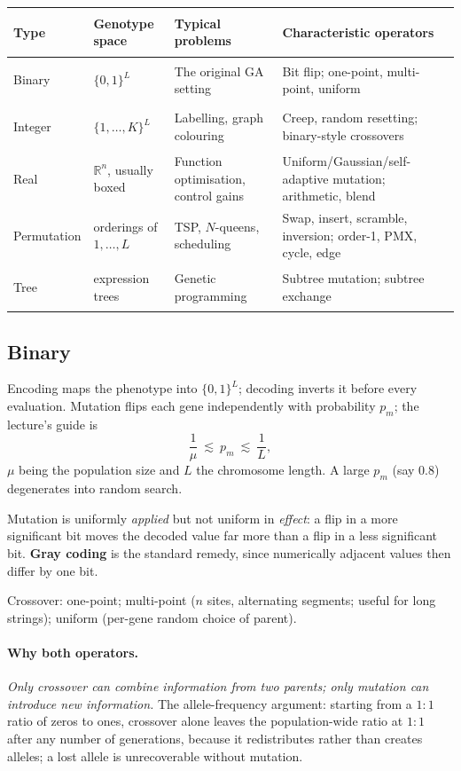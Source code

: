 \documentclass[11pt,a4paper]{article}
\newcommand{\R}{\mathbb{R}}
\begin{document}
\begin{center}
\begin{tabular}{@{}>{\bfseries\raggedright\arraybackslash}p{}
  >{\raggedright\arraybackslash}p{}
  >{\raggedright\arraybackslash}p{}
  >{\raggedright\arraybackslash}p{}@{}}
\toprule
Type & Genotype space & Typical problems & Characteristic operators\\
\midrule
Binary & $\{0,1\}^L$ & The original GA setting & Bit flip; one-point, multi-point, uniform\\
Integer & $\{1,\ldots,K\}^L$ & Labelling, graph colouring & Creep, random resetting; binary-style crossovers\\
Real & $\R^n$, usually boxed & Function optimisation, control gains & Uniform/Gaussian/self-adaptive mutation; arithmetic, blend\\
Permutation & orderings of $1,\ldots,L$ & TSP, $N$-queens, scheduling & Swap, insert, scramble, inversion; order-1, PMX, cycle, edge\\
Tree & expression trees & Genetic programming & Subtree mutation; subtree exchange\\
\bottomrule
\end{tabular}
\end{center}

\subsection{Binary}

Encoding maps the phenotype into $\{0,1\}^L$; decoding inverts it before
every evaluation. Mutation flips each gene independently with probability
$p_m$; the lecture's guide is
\[
  \frac1\mu \ \lesssim\ p_m\ \lesssim\ \frac1L ,
\]
$\mu$ being the population size and $L$ the chromosome length. A large $p_m$
(say $0.8$) degenerates into random search.

Mutation is uniformly \emph{applied} but not uniform in \emph{effect}: a flip
in a more significant bit moves the decoded value far more than a flip in a
less significant bit. \textbf{Gray coding} is the standard remedy, since
numerically adjacent values then differ by one bit.

Crossover: one-point; multi-point ($n$ sites, alternating segments; useful for
long strings); uniform (per-gene random choice of parent).

\paragraph{Why both operators.} \emph{Only crossover can combine information
from two parents; only mutation can introduce new information.} The
allele-frequency argument: starting from a $1{:}1$ ratio of zeros to ones,
crossover alone leaves the population-wide ratio at $1{:}1$ after any number
of generations, because it redistributes rather than creates alleles; a lost
allele is unrecoverable without mutation.
\end{document}
